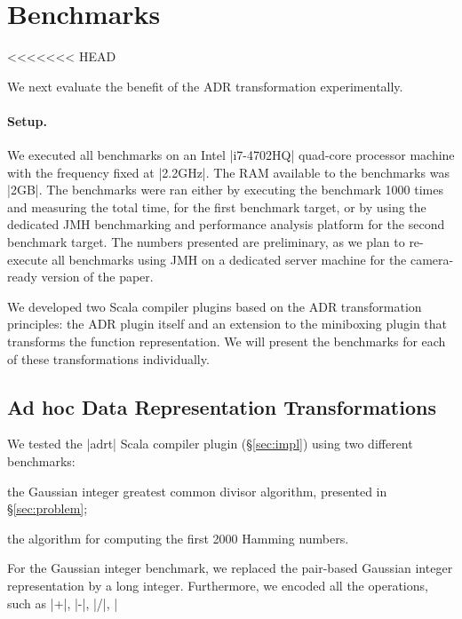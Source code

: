 \section{Benchmarks}
\label{sec:benchmarks}

<<<<<<< HEAD

We next evaluate the benefit of the ADR transformation experimentally.

\paragraph{Setup.} We executed all benchmarks on an Intel |i7-4702HQ| quad-core processor
machine with the frequency fixed at |2.2GHz|. The RAM available to the
benchmarks was |2GB|. The benchmarks were ran either by executing the
benchmark 1000 times and measuring the total time, for the first
benchmark target, or by using the dedicated JMH benchmarking and
performance analysis platform \cite{aleksey_shipilev_openjdk:_????}
for the second benchmark target. The numbers presented are
preliminary, as we plan to re-execute all benchmarks using JMH on a
dedicated server machine for the camera-ready version of the paper.

We developed two Scala compiler plugins based on the ADR
transformation principles: the ADR plugin itself and an extension to
the miniboxing plugin \cite{miniboxing} that transforms the function
representation. We will present the benchmarks for each of these
transformations individually.

\subsection{Ad hoc Data Representation Transformations}
\label{sec:benchmarks:ad-hoc}

We tested the |adrt| Scala compiler plugin (\S\ref{sec:impl}) using two different benchmarks:

\begin{compactitem}
\item the Gaussian integer greatest common divisor algorithm, presented in \S\ref{sec:problem};
\item the algorithm for computing the first 2000 Hamming numbers.
\end{compactitem}

For the Gaussian integer benchmark, we replaced the pair-based Gaussian integer representation by a long integer. Furthermore, we encoded all the operations, such as |+|, |-|, |/|, |%

